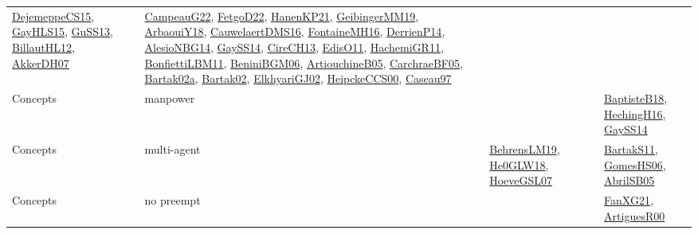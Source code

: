{\begin{longtable}{lp{3cm}>{\raggedright}p{6cm}>{\raggedright}p{6cm}p{8cm}}
\href{papers/DejemeppeCS15.pdf}{DejemeppeCS15}\cite{DejemeppeCS15}, \href{papers/GayHLS15.pdf}{GayHLS15}\cite{GayHLS15}, \href{papers/GuSS13.pdf}{GuSS13}\cite{GuSS13}, \href{papers/BillautHL12.pdf}{BillautHL12}\cite{BillautHL12}, \href{papers/AkkerDH07.pdf}{AkkerDH07}\cite{AkkerDH07} & \href{articles/CampeauG22.pdf}{CampeauG22}\cite{CampeauG22}, \href{articles/FetgoD22.pdf}{FetgoD22}\cite{FetgoD22}, \href{papers/HanenKP21.pdf}{HanenKP21}\cite{HanenKP21}, \href{papers/GeibingerMM19.pdf}{GeibingerMM19}\cite{GeibingerMM19}, \href{papers/ArbaouiY18.pdf}{ArbaouiY18}\cite{ArbaouiY18}, \href{papers/CauwelaertDMS16.pdf}{CauwelaertDMS16}\cite{CauwelaertDMS16}, \href{papers/FontaineMH16.pdf}{FontaineMH16}\cite{FontaineMH16}, \href{papers/DerrienP14.pdf}{DerrienP14}\cite{DerrienP14}, \href{papers/AlesioNBG14.pdf}{AlesioNBG14}\cite{AlesioNBG14}, \href{papers/GaySS14.pdf}{GaySS14}\cite{GaySS14}, \href{papers/CireCH13.pdf}{CireCH13}\cite{CireCH13}, \href{papers/EdisO11.pdf}{EdisO11}\cite{EdisO11}, \href{articles/HachemiGR11.pdf}{HachemiGR11}\cite{HachemiGR11}, \href{papers/BonfiettiLBM11.pdf}{BonfiettiLBM11}\cite{BonfiettiLBM11}, \href{papers/BeniniBGM06.pdf}{BeniniBGM06}\cite{BeniniBGM06}, \href{papers/ArtiouchineB05.pdf}{ArtiouchineB05}\cite{ArtiouchineB05}, \href{papers/CarchraeBF05.pdf}{CarchraeBF05}\cite{CarchraeBF05}, \href{papers/Bartak02a.pdf}{Bartak02a}\cite{Bartak02a}, \href{papers/Bartak02.pdf}{Bartak02}\cite{Bartak02}, \href{papers/ElkhyariGJ02.pdf}{ElkhyariGJ02}\cite{ElkhyariGJ02}, \href{articles/HeipckeCCS00.pdf}{HeipckeCCS00}\cite{HeipckeCCS00}, \href{papers/Caseau97.pdf}{Caseau97}\cite{Caseau97}\\
Concepts & manpower &  &  & \href{articles/BaptisteB18.pdf}{BaptisteB18}\cite{BaptisteB18}, \href{papers/HechingH16.pdf}{HechingH16}\cite{HechingH16}, \href{papers/GaySS14.pdf}{GaySS14}\cite{GaySS14}\\
Concepts & multi-agent & \href{papers/BehrensLM19.pdf}{BehrensLM19}\cite{BehrensLM19}, \href{papers/He0GLW18.pdf}{He0GLW18}\cite{He0GLW18}, \href{papers/HoeveGSL07.pdf}{HoeveGSL07}\cite{HoeveGSL07} &  & \href{articles/BartakS11.pdf}{BartakS11}\cite{BartakS11}, \href{papers/GomesHS06.pdf}{GomesHS06}\cite{GomesHS06}, \href{papers/AbrilSB05.pdf}{AbrilSB05}\cite{AbrilSB05}\\
Concepts & no preempt &  &  & \href{articles/FanXG21.pdf}{FanXG21}\cite{FanXG21}, \href{articles/ArtiguesR00.pdf}{ArtiguesR00}\cite{ArtiguesR00}\\

\end{longtable}}

